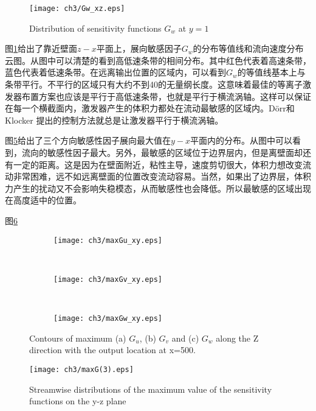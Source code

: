 \begin{figure}[htb]
  \centering
  \texttt{[image: ch3/Gw\_xz.eps]}\\
  \caption{Distribution of sensitivity functions $G_w$ at $y=1$}\label{f:Gw_xz}
\end{figure}

图\ref{f:Gw_xz}给出了靠近壁面$z-x$平面上，展向敏感因子$G_w$的分布等值线和流向速度分布云图。从图中可以清楚的看到高低速条带的相间分布。其中红色代表着高速条带，蓝色代表着低速条带。在远离输出位置的区域内，可以看到$G_w$的等值线基本上与条带平行。不平行的区域只有大约不到40的无量纲长度。这意味着最佳的等离子激发器布置方案也应该是平行于高低速条带，也就是平行于横流涡轴。这样可以保证在每一个横截面内，激发器产生的体积力都处在流动最敏感的区域内。D\"orr和Klocker \cite{dorr2015stabilisation,dorr2016}提出的控制方法就总是让激发器平行于横流涡轴。

图\ref{f:Guvw_xy}给出了三个方向敏感性因子展向最大值在$y-x$平面内的分布。从图中可以看到，流向的敏感性因子最大。另外，最敏感的区域位于边界层内，但是离壁面却还有一定的距离。这是因为在壁面附近，粘性主导，速度剪切很大，体积力想改变流动非常困难，远不如远离壁面的位置改变流动容易。当然，如果出了边界层，体积力产生的扰动又不会影响失稳模态，从而敏感性也会降低。所以最敏感的区域出现在高度适中的位置。

图\ref{f:maxsen}
\begin{figure}[H]
  \centering
  \begin{subfigure}{\textwidth}
  \texttt{[image: ch3/maxGu\_xy.eps]}
  \caption{\label{f:Gu_xy}}
  \end{subfigure}\\
  \bigskip
  \begin{subfigure}{\textwidth}
  \texttt{[image: ch3/maxGv\_xy.eps]}
  \caption{\label{f:Gv_xy}}
  \end{subfigure}\\
  \bigskip
  \begin{subfigure}{\textwidth}
  \texttt{[image: ch3/maxGw\_xy.eps]}
  \caption{\label{f:Gw_xy}}
  \end{subfigure}
  \caption{Contours of maximum (a) $G_u$, (b) $G_v$ and (c) $G_w$ along the Z direction with the output location at x=500.}\label{f:Guvw_xy}
\end{figure}
\begin{figure}[htb]
  \centering
  \texttt{[image: ch3/maxG(3).eps]}\\
  \caption{Streamwise distributions of the maximum value of the sensitivity functions on the y-z plane}\label{f:maxsen}
\end{figure}

